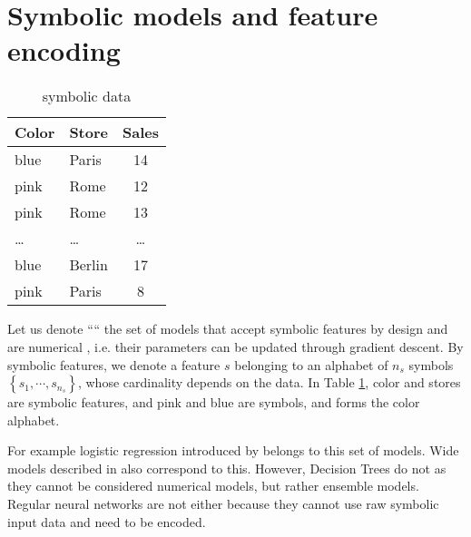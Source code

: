 \section{Symbolic models and feature encoding}\label{sec:encoding}


\begin{table}[h!]%
  \caption{symbolic data}
  \label{tab:catData}
  \begin{footnotesize}
  \begin{center}
  \begin{tabular}{llc}
    \toprule
    Color & Store & Sales \\
    \midrule
    blue  & Paris    & 14 \\
    pink  & Rome     & 12 \\
    pink  & Rome     & 13 \\
    \dots & \dots    & \dots \\
    blue  & Berlin     & 17 \\
    pink  & Paris     & 8  \\
  \bottomrule
\end{tabular}
\end{center}
\end{footnotesize}
\end{table}

Let us denote ``\catmod`` the set of models that accept symbolic features by design and are numerical , i.e. their parameters can be updated through gradient descent.
By symbolic features, we denote a feature $s$ belonging to an alphabet of $n_{s}$ symbols $\left\{s_1,\cdots, s_{n_{s}} \right\}$, whose cardinality depends on the data. In Table \ref{tab:catData}, color and stores are symbolic features, and pink and blue are symbols, and forms the color alphabet.

For example logistic regression introduced by \cite{cox1958regression} belongs to this set of models. 
Wide models described in \cite{wideAndDeep} also correspond to this.
However, Decision Trees do not as they cannot be considered numerical models, but rather ensemble models. Regular neural networks are not \catmod either because they cannot use raw symbolic input data and need to be encoded.


